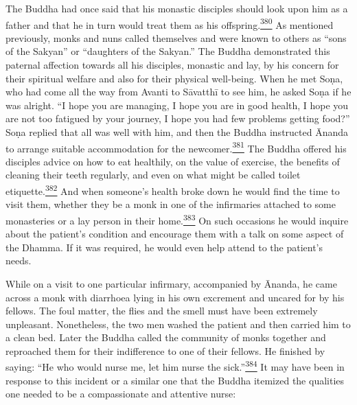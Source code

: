The Buddha had once said that his monastic disciples should look upon
him as a father and that he in turn would treat them as his
offspring.\label{footprints_split_011.html_fnref380}\hyperref[footprints_split_024.htmlux5cux23fn380]{\textsuperscript{380}}
As mentioned previously, monks and nuns called themselves and were known
to others as ``sons of the Sakyan'' or ``daughters of the Sakyan.'' The
Buddha demonstrated this paternal affection towards all his disciples,
monastic and lay, by his concern for their spiritual welfare and also
for their physical well-being. When he met Soṇa, who had come all the
way from Avanti to Sāvatthī to see him, he asked Soṇa if he was alright.
``I hope you are managing, I hope you are in good health, I hope you are
not too fatigued by your journey, I hope you had few problems getting
food?'' Soṇa replied that all was well with him, and then the Buddha
instructed Ānanda to arrange suitable accommodation for the
newcomer.\label{footprints_split_011.html_fnref381}\hyperref[footprints_split_024.htmlux5cux23fn381]{\textsuperscript{381}}
The Buddha offered his disciples advice on how to eat healthily, on the
value of exercise, the benefits of cleaning their teeth regularly, and
even on what might be called toilet
etiquette.\label{footprints_split_011.html_fnref382}\hyperref[footprints_split_024.htmlux5cux23fn382]{\textsuperscript{382}}
And when someone's health broke down he would find the time to visit
them, whether they be a monk in one of the infirmaries attached to some
monasteries or a lay person in their
home.\label{footprints_split_011.html_fnref383}\hyperref[footprints_split_024.htmlux5cux23fn383]{\textsuperscript{383}}
On such occasions he would inquire about the patient's condition and
encourage them with a talk on some aspect of the Dhamma. If it was
required, he would even help attend to the patient's needs.

While on a visit to one particular infirmary, accompanied by Ānanda, he
came across a monk with diarrhoea lying in his own excrement and uncared
for by his fellows. The foul matter, the flies and the smell must have
been extremely unpleasant. Nonetheless, the two men washed the patient
and then carried him to a clean bed. Later the Buddha called the
community of monks together and reproached them for their indifference
to one of their fellows. He finished by saying: ``He who would nurse me,
let him nurse the
sick.''\label{footprints_split_011.html_fnref384}\hyperref[footprints_split_024.htmlux5cux23fn384]{\textsuperscript{384}}
It may have been in response to this incident or a similar one that the
Buddha itemized the qualities one needed to be a compassionate and
attentive nurse:

